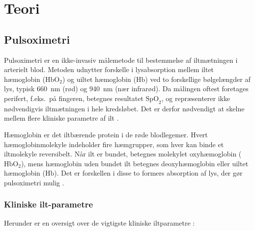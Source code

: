 \chapter{Teori}
\label{chap:teori}

\section{Pulsoximetri}
Pulsoximetri er en ikke-invasiv målemetode til bestemmelse af iltmætningen i arterielt blod. Metoden udnytter forskelle i lysabsorption mellem iltet hæmoglobin ($\text{HbO}_2$) og uiltet hæmoglobin ($\text{Hb}$) ved to forskellige bølgelængder af lys, typisk \SI{660}{nm} (rød) og \SI{940}{nm} (nær infrarød). Da målingen oftest foretages perifert, f.eks.\ på fingeren, betegnes resultatet $\text{SpO}_2$, og repræsenterer ikke nødvendigvis iltmætningen i hele kredsløbet. Det er derfor nødvendigt at skelne mellem flere kliniske parametre af ilt \cite{Webster1997,Nitzan2014}.

Hæmoglobin er det iltbærende protein i de røde blodlegemer. Hvert hæmoglobinmolekyle indeholder fire hæmgrupper, som hver kan binde et iltmolekyle reversibelt. Når ilt er bundet, betegnes molekylet oxyhæmoglobin ($\text{HbO}_2$), mens hæmoglobin uden bundet ilt betegnes deoxyhæmoglobin eller uiltet hæmoglobin ($\text{Hb}$). Det er forskellen i disse to formers absorption af lys, der gør pulsoximetri mulig \cite{Webster1997,Nitzan2014}.

\subsection{Kliniske ilt-parametre}
Herunder er en oversigt over de vigtigste kliniske iltparametre \cite{Pltz1998,Nitzan2014,Webster1997,YossefHay2018}:

